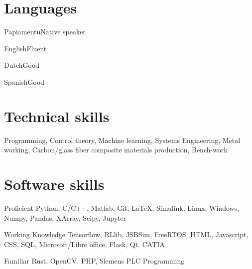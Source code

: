\documentclass{tccv}
\begin{document}
\section{Languages}

\begin{factlist}
    \item{Papiamentu}{Native speaker}
    \item{English}{Fluent}
    \item{Dutch}{Good}
    \item{Spanish}{Good}
\end{factlist}


\section{Technical skills}

Programming, Control theory, Machine learning, Systems Engineering, Metal working, Carbon/glass fiber composite materials production, Bench-work


\section{Software skills}

\begin{factlist}

\item{Proficient}
     {Python, C/C++, Matlab, Git, \LaTeX, Simulink, Linux, Windows, Numpy, Pandas, XArray, Scipy, Jupyter}

\item{Working Knowledge}
     {Tensorflow, RLlib, JSBSim, FreeRTOS, HTML, Javascript, CSS, SQL, Microsoft/Libre office, Flask, Qt, CATIA}

\item{Familiar}
     {Rust, OpenCV, PHP, Siemens PLC Programming}

\end{factlist}
\end{document}
